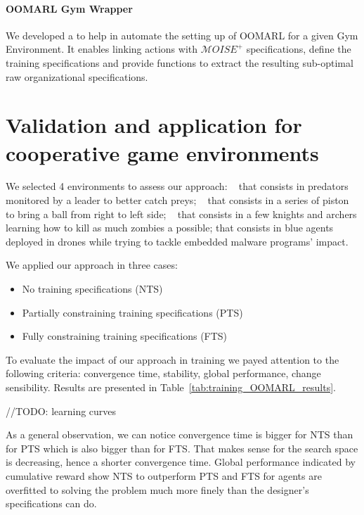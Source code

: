 \documentclass[runningheads]{llncs}
\begin{document}
\paragraph{\textbf{OOMARL Gym Wrapper}\label{gym-wrapper}} We developed a  to help in automate the setting up of OOMARL for a given Gym Environment. It enables linking actions with $\mathcal{M}OISE^+$ specifications, define the training specifications and provide functions to extract the resulting sub-optimal raw organizational specifications.

\section{Validation and application for cooperative game environments}


We selected 4 environments to assess our approach: ~\cite{Lowe2017} that consists in predators monitored by a leader to better catch preys; ~\cite{Terry2021} that consists in a series of piston to bring a ball from right to left side; ~\cite{Terry2021} that consists in a few knights and archers learning how to kill as much zombies a possible;  that consists in blue agents deployed in drones while trying to tackle embedded malware programs' impact.

We applied our approach in three cases:
\begin{itemize}
    \item No training specifications (NTS)
    \item Partially constraining training specifications (PTS)
    \item Fully constraining training specifications (FTS)
\end{itemize}

To evaluate the impact of our approach in training we payed attention to the following criteria: convergence time, stability, global performance, change sensibility. Results are presented in Table~\ref{tab:training_OOMARL_results}.

//TODO: learning curves



As a general observation, we can notice convergence time is bigger for NTS than for PTS which is also bigger than for FTS. That makes sense for the search space is decreasing, hence a shorter convergence time. Global performance indicated by cumulative reward show NTS to outperform PTS and FTS for agents are overfitted to solving the problem much more finely than the designer's specifications can do.
\end{document}
